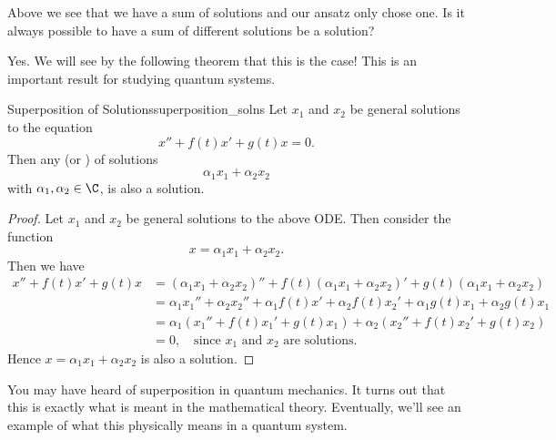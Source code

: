         \begin{question}
        Above we see that we have a sum of solutions and our ansatz only chose one. Is it always possible to have a sum of different solutions be a solution?
        \end{question}

        \begin{answer}
        Yes. We will see by the following theorem that this is the case! This is an important result for studying quantum systems.
        \end{answer}

        \begin{thm}{Superposition of Solutions}{superposition_solns}
        Let $x_1$ and $x_2$ be general solutions to the equation
        \[
        x''+f(t)x'+g(t)x=0.
        \]
        Then any  (or ) of solutions
        \[
        \alpha_1 x_1 + \alpha_2 x_2
        \]
        with $\alpha_1,\alpha_2\in \C$, is also a solution.\\

        \begin{proof}
        Let $x_1$ and $x_2$ be general solutions to the above ODE. Then consider the function
        \[
        x=\alpha_1 x_1 + \alpha_2 x_2.
        \]
        Then we have
        \begin{align*}
            x''+f(t)x'+g(t)x&= (\alpha_1 x_1 + \alpha_2 x_2)''+f(t)(\alpha_1x_1+\alpha_2 x_2)'+g(t)(\alpha_1x_1+\alpha_2x_2)\\
            &= \alpha_1 x_1'' + \alpha_2 x_2'' + \alpha_1 f(t)x'+\alpha_2 f(t)x_2'+\alpha_1 g(t)x_1 + \alpha_2 g(t) x_1\\
            &= \alpha_1 ( x_1''+f(t)x_1'+g(t)x_1)+\alpha_2(x_2''+f(t)x_2'+g(t)x_2)\\
            &=0, \quad\textrm{since $x_1$ and $x_2$ are solutions.}
        \end{align*}
        Hence $x=\alpha_1x_1 + \alpha_2 x_2$ is also a solution.
        \end{proof}
        \end{thm}

        \begin{remark}
        You may have heard of superposition in quantum mechanics. It turns out that this is exactly what is meant in the mathematical theory. Eventually, we'll see an example of what this physically means in a quantum system.
        \end{remark}

